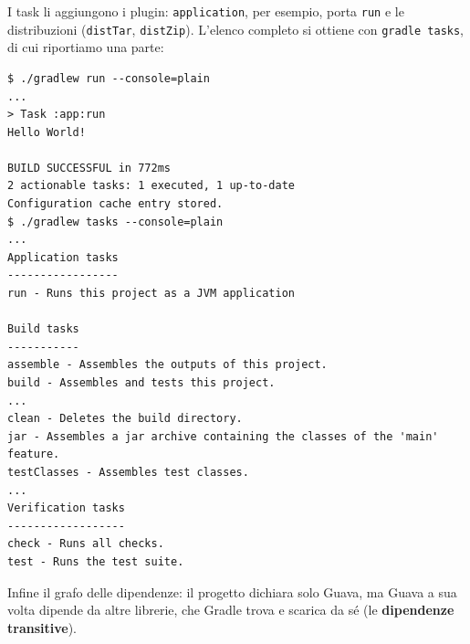 \begin{center}
\end{center}

I task li aggiungono i plugin: \texttt{application}, per esempio, porta \texttt{run} e le distribuzioni
(\texttt{distTar}, \texttt{distZip}). L'elenco completo si ottiene con \texttt{gradle tasks}, di cui riportiamo una
parte:

\begin{lstlisting}[style=shell, name=Terminale]
$ ./gradlew run --console=plain
...
> Task :app:run
Hello World!

BUILD SUCCESSFUL in 772ms
2 actionable tasks: 1 executed, 1 up-to-date
Configuration cache entry stored.
$ ./gradlew tasks --console=plain
...
Application tasks
-----------------
run - Runs this project as a JVM application

Build tasks
-----------
assemble - Assembles the outputs of this project.
build - Assembles and tests this project.
...
clean - Deletes the build directory.
jar - Assembles a jar archive containing the classes of the 'main' feature.
testClasses - Assembles test classes.
...
Verification tasks
------------------
check - Runs all checks.
test - Runs the test suite.
\end{lstlisting}

Infine il grafo delle dipendenze: il progetto dichiara solo Guava, ma Guava a sua volta dipende da altre librerie, che
Gradle trova e scarica da sé (le \textbf{dipendenze transitive}).

